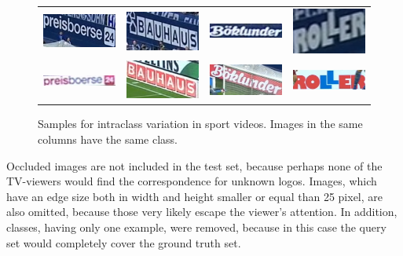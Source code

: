\begin{figure}
  \centering
    \begin{tabular}{cccc}
      \includegraphics[width=25mm]{images/mt/largevar_1_b.jpg} &   \includegraphics[width=25mm]{images/mt/largevar_2_a.jpg}  & \includegraphics[width=25mm]{images/mt/largevar_3_a.jpg} &   \includegraphics[width=25mm]{images/mt/largevar_4_a.jpg} \\
      \includegraphics[width=25mm]{images/mt/largevar_1_a.jpg} &   \includegraphics[width=25mm]{images/mt/largevar_2_b.jpg}  & \includegraphics[width=25mm]{images/mt/largevar_3_b.jpg} &   \includegraphics[width=25mm]{images/mt/largevar_4_b.jpg}
    \end{tabular}
  \caption{Samples for intraclass variation in sport videos. Images in the same columns have the same class.}
  \label{f:largevar}
\end{figure}
Occluded images are not included in the test set, because perhaps none of the TV-viewers would find the correspondence for unknown logos. Images, which have an edge size both in width and height smaller or equal than 25 pixel, are also omitted, because those very likely escape the viewer's attention. In addition, classes, having only one example, were removed, because in this case the query set would completely cover the ground truth set.

